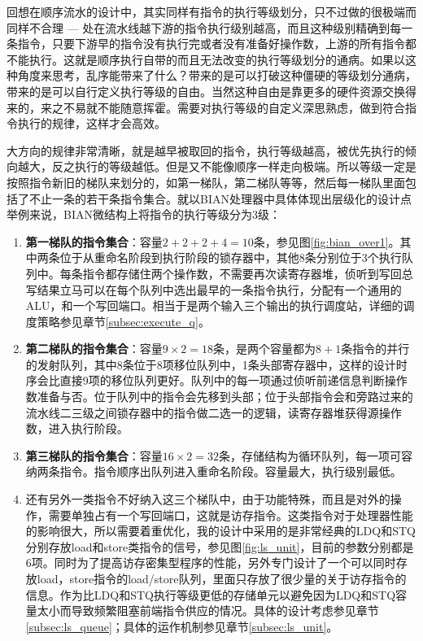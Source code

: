 回想在顺序流水的设计中，其实同样有指令的执行等级划分，只不过做的很极端而同样不合理 --- 处在流水线越下游的指令执行级别越高，而且这种级别精确到每一条指令，只要下游早的指令没有执行完或者没有准备好操作数，上游的所有指令都不能执行。这就是顺序执行自带的而且无法改变的执行等级划分的通病。如果以这种角度来思考，乱序能带来了什么？带来的是可以打破这种僵硬的等级划分通病，带来的是可以自行定义执行等级的自由。当然这种自由是靠更多的硬件资源交换得来的，来之不易就不能随意挥霍。需要对执行等级的自定义深思熟虑，做到符合指令执行的规律，这样才会高效。

大方向的规律非常清晰，就是越早被取回的指令，执行等级越高，被优先执行的倾向越大，反之执行的等级越低。但是又不能像顺序一样走向极端。所以等级一定是按照指令新旧的梯队来划分的，如第一梯队，第二梯队等等，然后每一梯队里面包括了不止一条的若干条指令集合。就以BIAN处理器中具体体现出层级化的设计点举例来说，BIAN微结构上将指令的执行等级分为3级：
\begin{enumerate}[label=(\alph*)]
	\item \textbf{第一梯队的指令集合}：容量$2 + 2 + 2 + 4 = 10$条，参见图\ref{fig:bian_over1}。其中两条位于从重命名阶段到执行阶段的锁存器中，其他8条分别位于3个执行队列中。每条指令都存储住两个操作数，不需要再次读寄存器堆，侦听到写回总写结果立马可以在每个队列中选出最早的一条指令执行，分配有一个通用的ALU，和一个写回端口。相当于是两个输入三个输出的执行调度站，详细的调度策略参见章节\ref{subsec:execute_q}。
	\item \textbf{第二梯队的指令集合}：容量$ 9\times 2 = 18$条，是两个容量都为$ 8 + 1 $条指令的并行的发射队列，其中8条位于8项移位队列中，1条头部寄存器中，这样的设计时序会比直接9项的移位队列更好。队列中的每一项通过侦听前递信息判断操作数准备与否。位于队列中的指令会先移到头部；位于头部指令会和旁路过来的流水线二三级之间锁存器中的指令做二选一的逻辑，读寄存器堆获得源操作数，进入执行阶段。
	\item \textbf{第三梯队的指令集合}：容量$ 16\times 2 = 32$条，存储结构为循环队列，每一项可容纳两条指令。指令顺序出队列进入重命名阶段。容量最大，执行级别最低。
	\item 还有另外一类指令不好纳入这三个梯队中，由于功能特殊，而且是对外的操作，需要单独占有一个写回端口，这就是访存指令。这类指令对于处理器性能的影响很大，所以需要着重优化，我的设计中采用的是非常经典的LDQ和STQ分别存放load和store类指令的信号，参见图\ref{fig:ls_unit}，目前的参数分别都是6项。同时为了提高访存密集型程序的性能，另外专门设计了一个可以同时存放load，store指令的load/store队列，里面只存放了很少量的关于访存指令的信息。作为比LDQ和STQ执行等级更低的存储单元以避免因为LDQ和STQ容量太小而导致频繁阻塞前端指令供应的情况。具体的设计考虑参见章节\ref{subsec:ls_queue}；具体的运作机制参见章节\ref{subsec:ls_unit}。
\end{enumerate}

